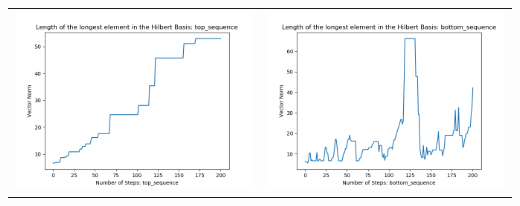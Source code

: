 \documentclass[10pt]{article}
\begin{document}
\begin{tabular}{c|c}
\begin{minipage}{.45\textwidth}
\includegraphics[width=\textwidth]{"DATA/5d/6 generators 2 bound I/top_sequence LENGTH"}
\end{minipage} &
\begin{minipage}{.45\textwidth}
\includegraphics[width=\textwidth]{"DATA/5d/6 generators 2 bound I bottomup/bottom_sequence LENGTH"}
\end{minipage}
\end{tabular}
\end{document}
